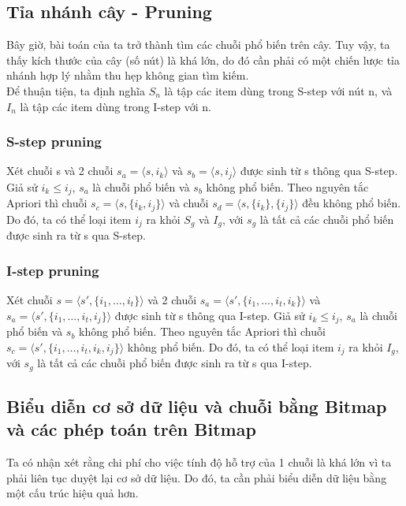 \documentclass[a4paper 14pt]{article}
\begin{document}
		\subsection{Tỉa nhánh cây - Pruning}
			Bây giờ, bài toán của ta trở thành tìm các chuỗi phổ biến trên cây. Tuy vậy, ta thấy kích thước của cây (số nút) là khá lớn, do đó cần phải có một chiến lược tỉa nhánh hợp lý nhằm thu hẹp không gian tìm kiếm.\\
			Để thuận tiện, ta định nghĩa $S_n$ là tập các item dùng trong S-step với nút n, và $I_n$ là tập các item dùng trong I-step với n.
			\subsubsection{S-step pruning}
				Xét chuỗi s và 2 chuỗi $s_a = \langle s, {i_k} \rangle$ và $s_b = \langle s, {i_j} \rangle$ được sinh từ s thông qua S-step. Giả sử $i_k \leq i_j$, $s_a$ là chuỗi phổ biến và $s_b$ không phổ biến. Theo nguyên tắc Apriori thì chuỗi $s_c = \langle s, \{i_k, i_j\}\rangle$ và chuỗi $s_d = \langle s, \{i_k\}, \{i_j\}\rangle$ đều không phổ biến. Do đó, ta có thể loại item $i_j$ ra khỏi $S_g$ và $I_g$, với $s_g$ là tất cả các chuỗi phổ biến được sinh ra từ s qua S-step.
			\subsubsection{I-step pruning}
				Xét chuỗi $s = \langle s', \{i_1, \hdots, i_t\}\rangle$ và 2 chuỗi $s_a = \langle s', \{i_1, \hdots, i_t, i_k\} \rangle$ và $s_a = \langle s', \{i_1, \hdots, i_t, i_j\} \rangle$ được sinh từ s thông qua I-step. Giả sử $i_k \leq i_j$, $s_a$ là chuỗi phổ biến và $s_b$ không phổ biến. Theo nguyên tắc Apriori thì chuỗi $s_c = \langle s', \{i_1, \hdots, i_t, i_k, i_j\}\rangle$ không phổ biến. Do đó, ta có thể loại item $i_j$ ra khỏi $I_g$, với $s_g$ là tất cả các chuỗi phổ biến được sinh ra từ s qua I-step.
		\subsection{Biểu diễn cơ sở dữ liệu và chuỗi bằng Bitmap và các phép toán trên Bitmap}
			Ta có nhận xét rằng chi phí cho việc tính độ hỗ trợ của 1 chuỗi là khá lớn vì ta phải liên tục duyệt lại cơ sở dữ liệu. Do đó, ta cần phải biểu diễn dữ liệu bằng một cấu trúc hiệu quả hơn.
\end{document}
